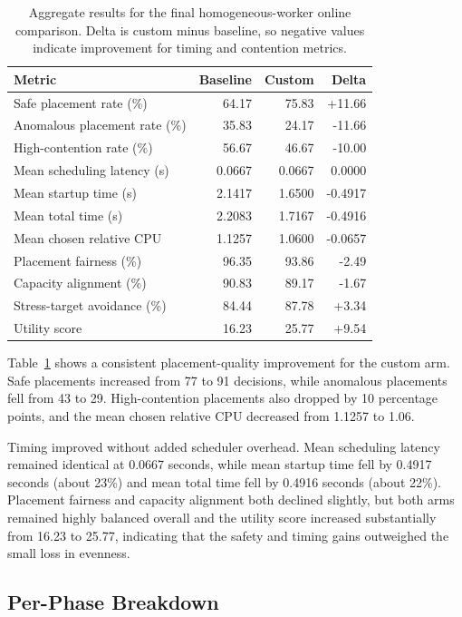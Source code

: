 \begin{table}[h]
\centering
\small
\begin{tabular}{lrrr}
\hline
\textbf{Metric} & \textbf{Baseline} & \textbf{Custom} & \textbf{Delta} \\
\hline
Safe placement rate (\%) & 64.17 & 75.83 & +11.66 \\
Anomalous placement rate (\%) & 35.83 & 24.17 & -11.66 \\
High-contention rate (\%) & 56.67 & 46.67 & -10.00 \\
Mean scheduling latency (s) & 0.0667 & 0.0667 & 0.0000 \\
Mean startup time (s) & 2.1417 & 1.6500 & -0.4917 \\
Mean total time (s) & 2.2083 & 1.7167 & -0.4916 \\
Mean chosen relative CPU & 1.1257 & 1.0600 & -0.0657 \\
Placement fairness (\%) & 96.35 & 93.86 & -2.49 \\
Capacity alignment (\%) & 90.83 & 89.17 & -1.67 \\
Stress-target avoidance (\%) & 84.44 & 87.78 & +3.34 \\
Utility score & 16.23 & 25.77 & +9.54 \\
\hline
\end{tabular}
\caption{Aggregate results for the final homogeneous-worker online comparison. Delta is custom minus baseline, so negative values indicate improvement for timing and contention metrics.}
\label{tab:ch5-aggregate-results}
\end{table}

Table~\ref{tab:ch5-aggregate-results} shows a consistent placement-quality improvement for the custom arm. Safe placements increased from 77 to 91 decisions, while anomalous placements fell from 43 to 29. High-contention placements also dropped by 10 percentage points, and the mean chosen relative CPU decreased from 1.1257 to 1.06.

Timing improved without added scheduler overhead. Mean scheduling latency remained identical at 0.0667 seconds, while mean startup time fell by 0.4917 seconds (about 23\%) and mean total time fell by 0.4916 seconds (about 22\%). Placement fairness and capacity alignment both declined slightly, but both arms remained highly balanced overall and the utility score increased substantially from 16.23 to 25.77, indicating that the safety and timing gains outweighed the small loss in evenness.


\subsection{Per-Phase Breakdown}

